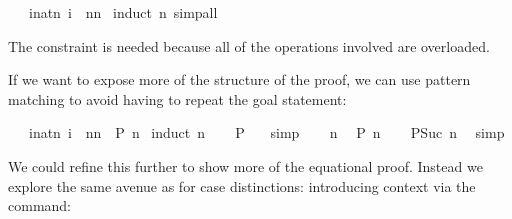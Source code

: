 \begin{isabellebody}
\isamarkupfalse%
\ {\isachardoublequote}{}\ {\isacharasterisk}\ {\isacharparenleft}{\isasymSum}i{\isacharcolon}{\isacharcolon}nat{\isasymle}n{\isachardot}\ i{\isacharparenright}\ {\isacharequal}\ n{\isacharasterisk}{\isacharparenleft}n{\isacharplus}{}{\isacharparenright}{\isachardoublequote}\isanewline
%
\isadelimproof
%
\endisadelimproof
%
\isatagproof
\isamarkupfalse%
\ {\isacharparenleft}induct\ n{\isacharcomma}\ simp{\isacharunderscore}all{\isacharparenright}%
\endisatagproof
{\isafoldproof}%
%
\isadelimproof
%
\endisadelimproof
\isamarkuptrue%
%
\begin{isamarkuptext}%
\noindent The constraint  is needed because all of
the operations involved are overloaded.

If we want to expose more of the structure of the
proof, we can use pattern matching to avoid having to repeat the goal
statement:%
\end{isamarkuptext}%
\isamarkupfalse%
\ {\isachardoublequote}{}\ {\isacharasterisk}\ {\isacharparenleft}{\isasymSum}i{\isacharcolon}{\isacharcolon}nat{\isasymle}n{\isachardot}\ i{\isacharparenright}\ {\isacharequal}\ n{\isacharasterisk}{\isacharparenleft}n{\isacharplus}{}{\isacharparenright}{\isachardoublequote}\ {\isacharparenleft}\ {\isachardoublequote}{\isacharquery}P\ n{\isachardoublequote}{\isacharparenright}\isanewline
%
\isadelimproof
%
\endisadelimproof
%
\isatagproof
\isamarkupfalse%
\ {\isacharparenleft}induct\ n{\isacharparenright}\isanewline
\ \ \isamarkupfalse%
\ {\isachardoublequote}{\isacharquery}P\ {}{\isachardoublequote}\ \isamarkupfalse%
\ simp\isanewline
\isamarkupfalse%
\isanewline
\ \ \isamarkupfalse%
\ n\ \isamarkupfalse%
\ {\isachardoublequote}{\isacharquery}P\ n{\isachardoublequote}\isanewline
\ \ \isamarkupfalse%
\ {\isachardoublequote}{\isacharquery}P{\isacharparenleft}Suc\ n{\isacharparenright}{\isachardoublequote}\ \isamarkupfalse%
\ simp\isanewline
\isamarkupfalse%
%
\endisatagproof
{\isafoldproof}%
%
\isadelimproof
%
\endisadelimproof
\isamarkuptrue%
%
\begin{isamarkuptext}%
\noindent We could refine this further to show more of the equational
proof. Instead we explore the same avenue as for case distinctions:
introducing context via the  command:%
\end{isamarkuptext}%

\end{isabellebody}
